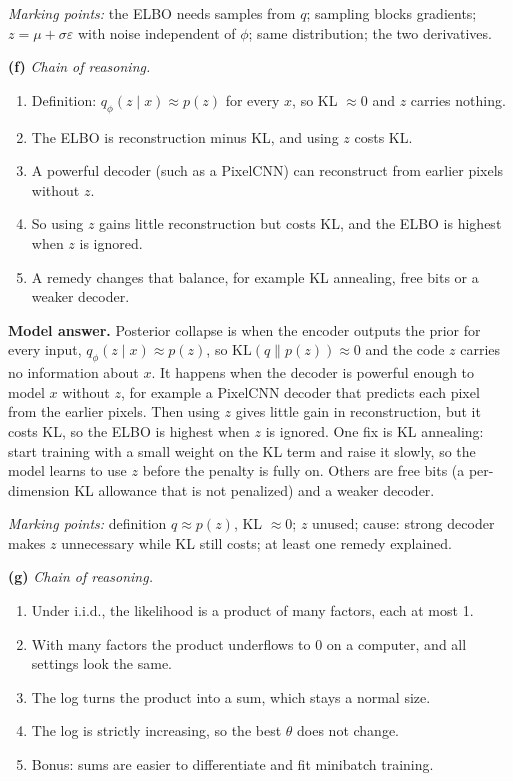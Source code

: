 \documentclass[12pt,a4paper]{article}
\begin{document}
\emph{Marking points:} the ELBO needs samples from $q$; sampling blocks gradients; $z=\mu+\sigma\varepsilon$ with noise independent of $\phi$; same distribution; the two derivatives.

\textbf{(f)} \emph{Chain of reasoning.}
\begin{enumerate}[nosep]
  \item Definition: $q_\phi(z\mid x)\approx p(z)$ for every $x$, so KL $\approx0$ and $z$ carries nothing.
  \item The ELBO is reconstruction minus KL, and using $z$ costs KL.
  \item A powerful decoder (such as a PixelCNN) can reconstruct from earlier pixels without $z$.
  \item So using $z$ gains little reconstruction but costs KL, and the ELBO is highest when $z$ is ignored.
  \item A remedy changes that balance, for example KL annealing, free bits or a weaker decoder.
\end{enumerate}

\textbf{Model answer.} Posterior collapse is when the encoder outputs the prior for every input, $q_\phi(z\mid x)\approx p(z)$, so $\mathrm{KL}(q\|p(z))\approx0$ and the code $z$ carries no information about $x$. It happens when the decoder is powerful enough to model $x$ without $z$, for example a PixelCNN decoder that predicts each pixel from the earlier pixels. Then using $z$ gives little gain in reconstruction, but it costs KL, so the ELBO is highest when $z$ is ignored. One fix is KL annealing: start training with a small weight on the KL term and raise it slowly, so the model learns to use $z$ before the penalty is fully on. Others are free bits (a per-dimension KL allowance that is not penalized) and a weaker decoder.

\emph{Marking points:} definition $q\approx p(z)$, KL $\approx0$; $z$ unused; cause: strong decoder makes $z$ unnecessary while KL still costs; at least one remedy explained.

\textbf{(g)} \emph{Chain of reasoning.}
\begin{enumerate}[nosep]
  \item Under i.i.d., the likelihood is a product of many factors, each at most 1.
  \item With many factors the product underflows to 0 on a computer, and all settings look the same.
  \item The log turns the product into a sum, which stays a normal size.
  \item The log is strictly increasing, so the best $\theta$ does not change.
  \item Bonus: sums are easier to differentiate and fit minibatch training.
\end{enumerate}
\end{document}
